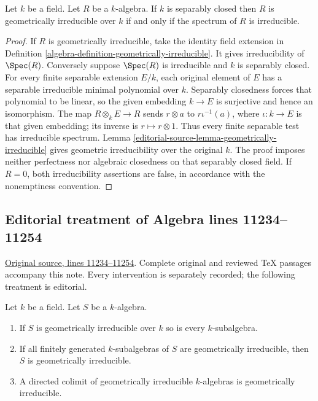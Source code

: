 \begin{lemma}
\label{editorial-source-lemma-separably-closed-irreducible-implies-geometric}
Let $k$ be a field.
Let $R$ be a $k$-algebra.
If $k$ is separably closed then $R$ is
geometrically irreducible over $k$ if and only if the
spectrum of $R$ is irreducible.
\end{lemma}

\begin{proof}
If $R$ is geometrically irreducible,
take the identity field extension in
Definition \ref{algebra-definition-geometrically-irreducible}.
It gives irreducibility of $\Spec(R)$.
Conversely suppose $\Spec(R)$ is
irreducible and $k$ is separably closed.
For every finite separable extension
$E/k$, each original element of $E$
has a separable irreducible minimal
polynomial over $k$. Separably closedness
forces that polynomial to be linear,
so the given embedding $k\to E$ is
surjective and hence an isomorphism.
The map $R\otimes_k E\to R$ sends
$r\otimes a$ to $r\iota^{-1}(a)$,
where $\iota:k\to E$ is that given
embedding; its inverse is $r\mapsto r\otimes1$.
Thus every finite separable test has
irreducible spectrum. Lemma
\ref{editorial-source-lemma-geometrically-irreducible}
gives geometric irreducibility over
the original $k$. The proof imposes
neither perfectness nor algebraic
closedness on that separably closed
field. If $R=0$, both irreducibility
assertions are false, in accordance
with the nonemptiness convention.
\end{proof}


\subsection{Editorial treatment of Algebra lines 11234--11254}

\hypertarget{algebra-context-140}{}

\noindent\href{https://github.com/stacks/stacks-project/blob/a04446e57ec1fbc252a871afcec7752fb2807b14/algebra.tex\#L11234}{Original source, lines 11234--11254}. Complete original and reviewed TeX passages accompany this note. Every intervention is separately recorded; the following treatment is editorial.


\begin{lemma}
\label{editorial-source-lemma-subalgebra-geometrically-irreducible}
Let $k$ be a field. Let $S$ be a $k$-algebra.
\begin{enumerate}
\item If $S$ is geometrically irreducible over $k$ so is every
$k$-subalgebra.
\item If all finitely generated $k$-subalgebras of $S$ are
geometrically irreducible, then $S$ is geometrically irreducible.
\item A directed colimit of geometrically irreducible $k$-algebras
is geometrically irreducible.
\end{enumerate}
\end{lemma}

